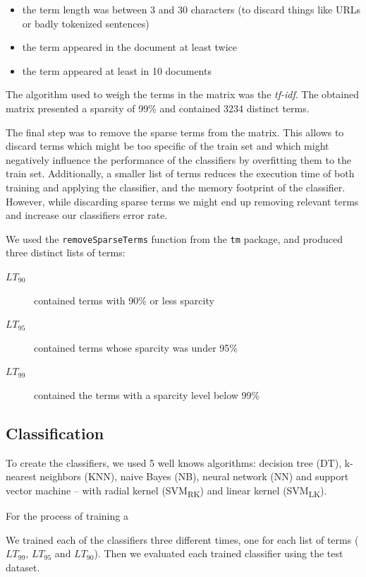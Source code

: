 \documentclass[conference]{IEEEtran}
\begin{document}
\begin{itemize}
    \item the term length was between 3 and 30 characters (to discard
        things like URLs or badly tokenized sentences)
    \item the term appeared in the document at least twice
    \item the term appeared at least in 10 documents
\end{itemize}
The algorithm used to weigh the terms in the matrix was the
\textit{tf-idf}\cite{christopher2008introduction}. The obtained matrix
presented a sparsity of 99\% and contained 3234 distinct terms.

The final step was to remove the sparse terms from the matrix.
This allows to discard terms which might be too specific of the train
set and which might negatively influence the performance of the
classifiers by overfitting them to the train set. Additionally, a
smaller list of terms reduces the execution time of both training and
applying the classifier, and the memory footprint of the classifier.
However, while discarding sparse terms we might end up removing
relevant terms and increase our classifiers error rate.

We used the \texttt{removeSparseTerms} function from the \texttt{tm}
package, and produced three distinct lists of terms:
\begin{description}
    \item[$LT_{90}$] contained terms with 90\% or less sparcity
    \item[$LT_{95}$] contained terms whose sparcity was under 95\%
    \item[$LT_{99}$] contained the terms with a sparcity level below 99\%
\end{description}

\subsection{Classification}

To create the classifiers, we used 5 well knows algorithms: decision
tree (DT), k-nearest neighbors (KNN), naive Bayes (NB), neural network
(NN) and support vector
machine -- with radial kernel (SVM\textsubscript{RK}) and linear
kernel (SVM\textsubscript{LK}).

For the process of training a

We trained each of the classifiers three different times, one for each
list of terms ($LT_{99}$, $LT_{95}$ and $LT_{90}$). Then we evaluated
each trained classifier using the test dataset.
\end{document}
